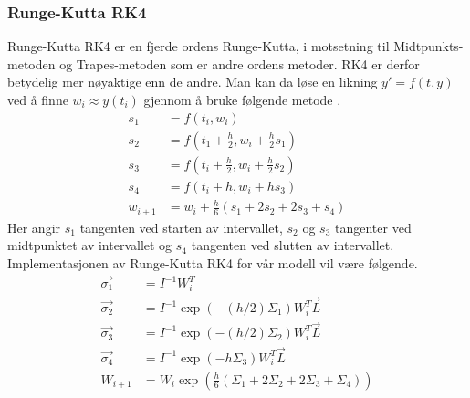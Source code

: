 \subsubsection{Runge-Kutta RK4}
Runge-Kutta RK4 er en fjerde ordens Runge-Kutta, i motsetning til Midtpunkts-metoden og Trapes-metoden som er andre ordens metoder. RK4 er derfor betydelig mer nøyaktige enn de andre. \newline\newline
Man kan da løse en likning $y' = f(t, y)$ ved å finne $w_i \approx y(t_i)$ gjennom å bruke følgende metode \cite{MATEMATIKK:1}. 
\begin{equation}
\begin{aligned}
    s_1&=f(t_i, w_i)\\
    s_2&=f(t_1+\frac{h}{2}, w_i + \frac{h}{2}s_1)\\
    s_3&=f(t_i+\frac{h}{2}, w_i+\frac{h}{2}s_2)\\
    s_4&=f(t_i+h, w_i+hs_3)\\
    w_{i+1}&=w_i+\frac{h}{6}(s_1+2s_2+2s_3+s_4)
\end{aligned}
\end{equation}
Her angir $s_1$ tangenten ved starten av intervallet, $s_2$ og $s_3$ tangenter ved midtpunktet av intervallet og $s_4$ tangenten ved slutten av intervallet.\newline\newline
Implementasjonen av Runge-Kutta RK4 for vår modell vil være følgende.
\begin{equation}
\begin{aligned}
    \Vec{\sigma_1}&=I^{-1}W^T_i\\
    \Vec{\sigma_2}&=I^{-1}\exp(-(h/2)\Sigma_1)W^T_i\Vec{L}\\
    \Vec{\sigma_3}&=I^{-1}\exp(-(h/2)\Sigma_2)W^T_i\Vec{L}\\
    \Vec{\sigma_4}&=I^{-1}\exp(-h\Sigma_3)W^T_i\Vec{L}\\
    W_{i+1}&=W_i\exp(\frac{h}{6}(\Sigma_1+2\Sigma_2+2\Sigma_3+\Sigma_4))
\end{aligned}
\end{equation}

